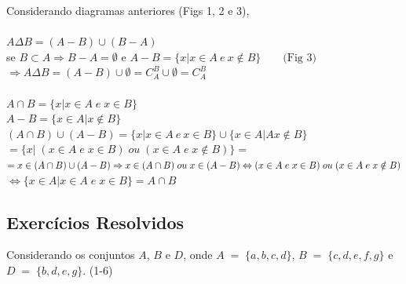 \noindent
Considerando diagramas anteriores (Figs 1, 2 e 3), \\ \\
$ A \Delta B = ( A - B)  \cup (B - A)$ \\

\noindent
se $ B \subset A \Rightarrow B - A = \emptyset $ e $ A - B = \{x | x \in A \ e \ x \notin B\} \qquad \text{(Fig 3)}$ \\

\noindent
$ \Rightarrow A \Delta B = ( A - B ) \cup \emptyset = C_A^B \cup \emptyset = C_A^B$ \\ \\

\noindent
\text{\maltese} $A \cap B = \{ x | x \in A \; e \; x \in B \} $ \\
$ A - B = \{ x \in A | x \notin B \} $ \\
$ ( A \cap B ) \cup ( A - B ) = \{ x |  x \in  A \ e \ x \in B \} \cup \{ x \in A | A  x \notin B \} $ \\
$ = \{ x | \; (x \in A \; e \; x \in B) \; ou \; ( x \in A \; e \; x \notin B ) \} = $ \\
$ = x \in (A \cap B) \cup(A - B) \Rightarrow x \in (A \cap B) \; ou \; x \in (A - B) \\ \Leftrightarrow ( x \in A \; e \; x \in B) \; ou \; ( x \in A \; e \; x \notin B ) $ \\
$ \Leftrightarrow \{ x \in A | x \in A \; e \; x \in B \} = A \cap B$ \\

\subsection{Exercícios Resolvidos}

	
Considerando os conjuntos $A$, $B$ e $D$, onde 
$A \; = \; \{ a, b, c, d \}$, $ B \; = \; \{ c, d, e, f, g \} $ e $ D \; = \; \{ b, d, e, g \} $. (1-6)  
	 
